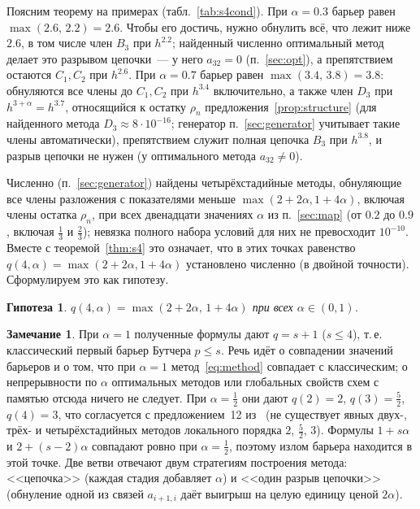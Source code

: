 \documentclass[11pt,a4paper]{article}
\theoremstyle{plain}
\newtheorem{conjecture}{Гипотеза}
\theoremstyle{definition}
\newtheorem{remark}{Замечание}
\begin{document}
Поясним теорему на примерах (табл.~\ref{tab:s4cond}). При $\alpha=0.3$ барьер равен $\max(2.6,\,2.2)=2.6$. Чтобы его достичь, нужно обнулить всё, что лежит ниже $2.6$, в том числе член $B_3$ при $h^{2.2}$; найденный численно оптимальный метод делает это разрывом цепочки~--- у него $a_{32}=0$ (п.~\ref{sec:opt}), а препятствием остаются $C_1,C_2$ при $h^{2.6}$. При $\alpha=0.7$ барьер равен $\max(3.4,\,3.8)=3.8$: обнуляются все члены до $C_1,C_2$ при $h^{3.4}$ включительно, а также член $D_3$ при $h^{3+\alpha}=h^{3.7}$, относящийся к остатку $\rho_n$ предложения~\ref{prop:structure} (для найденного метода $D_3\approx8\cdot10^{-16}$; генератор п.~\ref{sec:generator} учитывает такие члены автоматически), препятствием служит полная цепочка $B_3$ при $h^{3.8}$, и разрыв цепочки не нужен (у оптимального метода $a_{32}\neq0$).

Численно (п.~\ref{sec:generator}) найдены четырёхстадийные методы, обнуляющие все члены разложения с показателями меньше $\max(2+2\alpha,1+4\alpha)$, включая члены остатка $\rho_n$, при всех двенадцати значениях $\alpha$ из п.~\ref{sec:map} (от $0.2$ до $0.9$, включая $\frac13$ и $\frac23$); невязка полного набора условий для них не превосходит $10^{-10}$. Вместе с теоремой~\ref{thm:s4} это означает, что в этих точках равенство $q(4,\alpha)=\max(2+2\alpha,1+4\alpha)$ установлено численно (в двойной точности). Сформулируем это как гипотезу.

\begin{conjecture}\label{conj4}
$q(4,\alpha)=\max(2+2\alpha,\,1+4\alpha)$ при всех $\alpha\in(0,1)$.
\end{conjecture}

\begin{remark}
При $\alpha=1$ полученные формулы дают $q=s+1$ ($s\le4$), т.\,е. классический первый барьер Бутчера $p\le s$. Речь идёт о совпадении значений барьеров и о том, что при $\alpha=1$ метод~\eqref{eq:method} совпадает с классическим; о непрерывности по $\alpha$ оптимальных методов или глобальных свойств схем с памятью отсюда ничего не следует. При $\alpha=\frac12$ они дают $q(2)=2$, $q(3)=\frac52$, $q(4)=3$, что согласуется с предложением~12 из~\cite{Lubich1983} (не существует явных двух-, трёх- и четырёхстадийных методов локального порядка $2$, $\frac52$, $3$). Формулы $1+s\alpha$ и $2+(s-2)\alpha$ совпадают ровно при $\alpha=\frac12$, поэтому излом барьера находится в этой точке. Две ветви отвечают двум стратегиям построения метода: <<цепочка>> (каждая стадия добавляет $\alpha$) и <<один разрыв цепочки>> (обнуление одной из связей $a_{i+1,i}$ даёт выигрыш на целую единицу ценой $2\alpha$).
\end{remark}
\end{document}

